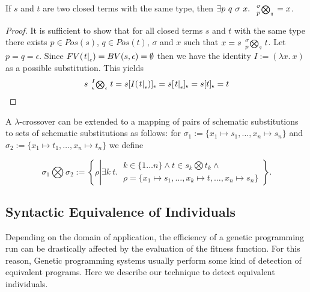 

\begin{thm}
  \label{crossover-existence}
  If $s$ and $t$ are two closed terms with the same type, then $\exists p\ q\ \sigma\ x.\ \left.\sideset{_{p}^{\sigma}}{_{q}^{}}{\scriptstyle\bigotimes}\right. = x$.
\end{thm}

\begin{proof}
  It is sufficient to show that for all closed terms $s$ and $t$ with the same type there exists $p \in Pos(s)$, $q \in Pos(t)$, $\sigma$ and $x$ such that $x = s \left.\sideset{_{p}^{\sigma}}{_{q}^{}}{\scriptstyle\bigotimes}\right. t$. Let $p = q = \epsilon$. Since $FV(\left. t \right|_{\epsilon}) = BV(s, \epsilon) = \emptyset$ then we have the identity $I := (\lambda x.\ x)$ as a possible substitution. This yields
  $$
  s \left.\sideset{_{\epsilon}^{I}}{_{\epsilon}^{}}{\scriptstyle\bigotimes}\right. t = s [I(\left. t \right|_{\epsilon})]_{\epsilon} = s [\left. t \right|_{\epsilon}]_{\epsilon} = s [t]_{\epsilon} = t
  $$
\end{proof}

A $\lambda$-crossover can be extended to a mapping of pairs of schematic substitutions to sets of schematic substitutions as follows: for $\sigma_1 := \{x_1 \mapsto s_1,\ldots,x_n \mapsto s_n \}$ and $\sigma_2 := \{x_1 \mapsto t_1,\ldots,x_n \mapsto t_n\}$ we define


$$
\sigma_1\bigotimes\sigma_2 := \left\{ \rho \left| \exists k\ t.\ \begin{array}{c}k\in\{1\ldots n\} \land t\in s_k {\scriptstyle\bigotimes} t_k \land \\ \rho = \{x_1 \mapsto s_1,\ldots,x_k \mapsto t, \ldots,x_n \mapsto s_n\}\end{array}\right.\right\}.
$$

\subsection{Syntactic Equivalence of Individuals}
\label{subsec:equivalence}
Depending on the domain of application, the efficiency of a genetic programming run can be drastically affected by the evaluation of the fitness function. For this reason, Genetic programming systems usually perform some kind of detection of equivalent programs. Here we describe our technique to detect equivalent individuals.

